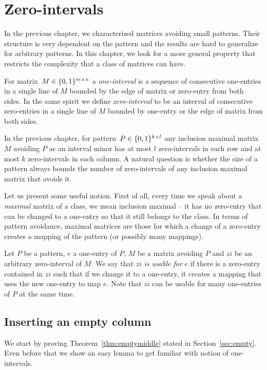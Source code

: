 \chapter{Zero-intervals}
\label{intervals}
In the previous chapter, we characterized matrices avoiding small patterns. Their structure is very dependent on the pattern and the results are hard to generalize for arbitrary patterns. In this chapter, we look for a more general property that restricts the complexity that a class of matrices can have.

\begin{defn}
For matrix~$M\in\{0,1\}^{m\times n}$ a \emph{one-interval} is a sequence of consecutive one-entries in a single line of $M$ bounded by the edge of matrix or zero-entry from both sides. In the same spirit we define \emph{zero-interval} to be an interval of consecutive zero-entries in a single line of $M$ bounded by one-entry or the edge of matrix from both sides.
\end{defn}

In the previous chapter, for pattern~$P\in\{0,1\}^{k\times l}$ any inclusion maximal matrix $M$ avoiding $P$ as an interval minor has at most $l$ zero-intervals in each row and at most $k$ zero-intervals in each column. A natural question is whether the size of a pattern always bounds the number of zero-intervals of any inclusion maximal matrix that avoids it.

Let us present some useful notion. First of all, every time we speak about a \emph{maximal} matrix of a class, we mean inclusion maximal -- it has no zero-entry that can be changed to a one-entry so that it still belongs to the class. In terms of pattern avoidance, maximal matrices are those for which a change of a zero-entry creates a mapping of the pattern (or possibly many mappings).

\begin{defn}
Let $P$ be a pattern, $e$ a one-entry of $P$, $M$ be a matrix avoiding $P$ and $zi$ be an arbitrary zero-interval of $M$. We say that $zi$ \emph{is usable for} $e$ if there is a zero-entry contained in $zi$ such that if we change it to a one-entry, it creates a mapping that uses the new one-entry to map $e$. Note that $zi$ can be usable for many one-entries of $P$ at the same time. 
\end{defn}

\section{Inserting an empty column}
We start by proving Theorem~\ref{thm:emptymiddle} stated in Section~\ref{sec:empty}. Even before that we show an easy lemma to get familiar with notion of one-intervals.


